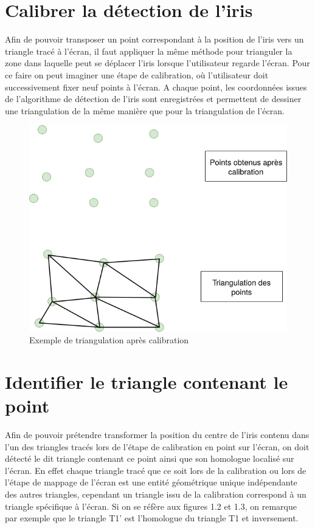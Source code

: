 \documentclass[a4paper, 12pt]{report}
\begin{document}
	\section{Calibrer la détection de l'iris}
	Afin de pouvoir transposer un point correspondant à la position de l'iris vers un triangle tracé à l'écran, il faut appliquer la même méthode pour trianguler la zone dans laquelle peut se déplacer l'iris lorsque l'utilisateur regarde l'écran. Pour ce faire on peut imaginer une étape de calibration, où l'utilisateur doit successivement fixer neuf points à l'écran. A chaque point, les coordonnées issues de l'algorithme de détection de l'iris sont enregistrées et permettent de dessiner une triangulation de la même manière que pour la triangulation de l'écran.
	\begin{figure}[!h]
		\includegraphics[scale=0.8]{calibration.png}
		\caption{Exemple de triangulation après calibration}	
	\end{figure}
	\newpage	
	\section{Identifier le triangle contenant le point}
	Afin de pouvoir prétendre transformer la position du centre de l'iris contenu dans l'un des triangles tracés lors de l'étape de calibration en point sur l'écran, on doit détecté le dit triangle contenant ce point ainsi que son homologue localisé sur l'écran. En effet chaque triangle tracé que ce soit lors de la calibration ou lors de l'étape de mappage de l'écran est une entité géométrique unique indépendante des autres triangles, cependant un triangle issu de la calibration correspond à un triangle spécifique à l'écran. Si on se réfère aux figures 1.2 et 1.3, on remarque par exemple que le triangle T1' est l'homologue du triangle T1 et inversement.
	
\end{document}
